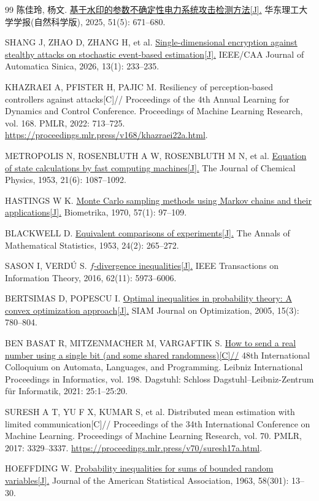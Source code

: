 \begin{thebibliography}{99}
陈佳玲, 杨文.
\href{https://doi.org/10.14135/j.cnki.1006-3080.20241227001}{基于水印的参数不确定性电力系统攻击检测方法[J].}
华东理工大学学报(自然科学版), 2025, 51(5): 671--680.

SHANG J, ZHAO D, ZHANG H, et al.
\href{https://doi.org/10.1109/JAS.2025.125381}{Single-dimensional encryption against stealthy attacks on stochastic event-based estimation[J].}
IEEE/CAA Journal of Automatica Sinica, 2026, 13(1): 233--235.

KHAZRAEI A, PFISTER H, PAJIC M.
Resiliency of perception-based controllers against attacks[C]//
Proceedings of the 4th Annual Learning for Dynamics and Control Conference.
Proceedings of Machine Learning Research, vol. 168.
PMLR, 2022: 713--725.
\url{https://proceedings.mlr.press/v168/khazraei22a.html}.

METROPOLIS N, ROSENBLUTH A W, ROSENBLUTH M N, et al.
\href{https://doi.org/10.1063/1.1699114}{Equation of state calculations by fast computing machines[J].}
The Journal of Chemical Physics, 1953, 21(6): 1087--1092.

HASTINGS W K.
\href{https://doi.org/10.1093/biomet/57.1.97}{Monte Carlo sampling methods using Markov chains and their applications[J].}
Biometrika, 1970, 57(1): 97--109.

BLACKWELL D.
\href{https://doi.org/10.1214/aoms/1177729032}{Equivalent comparisons of experiments[J].}
The Annals of Mathematical Statistics, 1953, 24(2): 265--272.

SASON I, VERD\'U S.
\href{https://doi.org/10.1109/TIT.2016.2603151}{$f$-divergence inequalities[J].}
IEEE Transactions on Information Theory, 2016, 62(11): 5973--6006.

BERTSIMAS D, POPESCU I.
\href{https://doi.org/10.1137/S1052623401399903}{Optimal inequalities in probability theory: A convex optimization approach[J].}
SIAM Journal on Optimization, 2005, 15(3): 780--804.

BEN BASAT R, MITZENMACHER M, VARGAFTIK S.
\href{https://doi.org/10.4230/LIPIcs.ICALP.2021.25}{How to send a real number using a single bit (and some shared randomness)[C]//}
48th International Colloquium on Automata, Languages, and Programming.
Leibniz International Proceedings in Informatics, vol. 198.
Dagstuhl: Schloss Dagstuhl--Leibniz-Zentrum f\"ur Informatik, 2021: 25:1--25:20.

SURESH A T, YU F X, KUMAR S, et al.
Distributed mean estimation with limited communication[C]//
Proceedings of the 34th International Conference on Machine Learning.
Proceedings of Machine Learning Research, vol. 70.
PMLR, 2017: 3329--3337.
\url{https://proceedings.mlr.press/v70/suresh17a.html}.

HOEFFDING W.
\href{https://doi.org/10.1080/01621459.1963.10500830}{Probability inequalities for sums of bounded random variables[J].}
Journal of the American Statistical Association, 1963, 58(301): 13--30.

\end{thebibliography}
